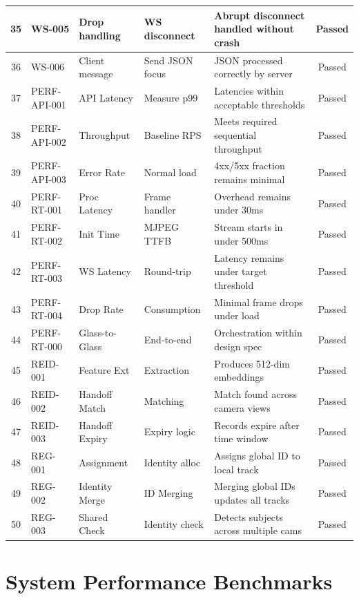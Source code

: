 \begin{longtable}{|c|p{1.5cm}|p{3.5cm}|p{3.5cm}|p{3.5cm}|c|}
35 & WS-005 & Drop handling & WS disconnect & Abrupt disconnect handled without crash & Passed \\ \hline
36 & WS-006 & Client message & Send JSON focus & JSON processed correctly by server & Passed \\ \hline
37 & PERF-API-001 & API Latency & Measure p99 & Latencies within acceptable thresholds & Passed \\ \hline
38 & PERF-API-002 & Throughput & Baseline RPS & Meets required sequential throughput & Passed \\ \hline
39 & PERF-API-003 & Error Rate & Normal load & 4xx/5xx fraction remains minimal & Passed \\ \hline
40 & PERF-RT-001 & Proc Latency & Frame handler & Overhead remains under 30ms & Passed \\ \hline
41 & PERF-RT-002 & Init Time & MJPEG TTFB & Stream starts in under 500ms & Passed \\ \hline
42 & PERF-RT-003 & WS Latency & Round-trip & Latency remains under target threshold & Passed \\ \hline
43 & PERF-RT-004 & Drop Rate & Consumption & Minimal frame drops under load & Passed \\ \hline
44 & PERF-RT-000 & Glass-to-Glass & End-to-end & Orchestration within design spec & Passed \\ \hline
45 & REID-001 & Feature Ext & Extraction & Produces 512-dim embeddings & Passed \\ \hline
46 & REID-002 & Handoff Match & Matching & Match found across camera views & Passed \\ \hline
47 & REID-003 & Handoff Expiry & Expiry logic & Records expire after time window & Passed \\ \hline
48 & REG-001 & Assignment & Identity alloc & Assigns global ID to local track & Passed \\ \hline
49 & REG-002 & Identity Merge & ID Merging & Merging global IDs updates all tracks & Passed \\ \hline
50 & REG-003 & Shared Check & Identity check & Detects subjects across multiple cams & Passed \\ \hline
\end{longtable}

\section{System Performance Benchmarks}
\label{section:system-performance-benchmarks}

